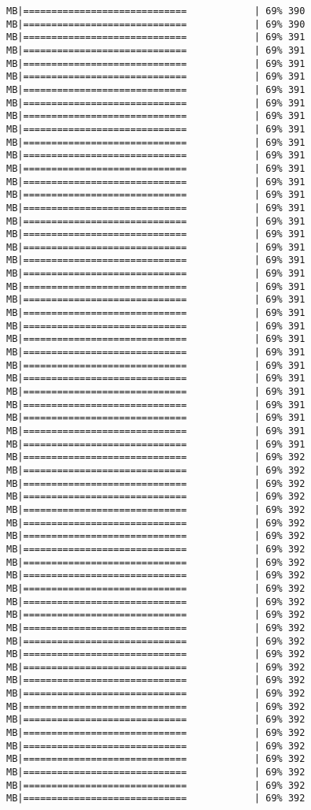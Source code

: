 \documentclass[
]{article}
\begin{document}
\begin{verbatim}
MB|=============================            | 69% 390 MB|=============================            | 69% 390 MB|=============================            | 69% 391 MB|=============================            | 69% 391 MB|=============================            | 69% 391 MB|=============================            | 69% 391 MB|=============================            | 69% 391 MB|=============================            | 69% 391 MB|=============================            | 69% 391 MB|=============================            | 69% 391 MB|=============================            | 69% 391 MB|=============================            | 69% 391 MB|=============================            | 69% 391 MB|=============================            | 69% 391 MB|=============================            | 69% 391 MB|=============================            | 69% 391 MB|=============================            | 69% 391 MB|=============================            | 69% 391 MB|=============================            | 69% 391 MB|=============================            | 69% 391 MB|=============================            | 69% 391 MB|=============================            | 69% 391 MB|=============================            | 69% 391 MB|=============================            | 69% 391 MB|=============================            | 69% 391 MB|=============================            | 69% 391 MB|=============================            | 69% 391 MB|=============================            | 69% 391 MB|=============================            | 69% 391 MB|=============================            | 69% 391 MB|=============================            | 69% 391 MB|=============================            | 69% 391 MB|=============================            | 69% 391 MB|=============================            | 69% 391 MB|=============================            | 69% 392 MB|=============================            | 69% 392 MB|=============================            | 69% 392 MB|=============================            | 69% 392 MB|=============================            | 69% 392 MB|=============================            | 69% 392 MB|=============================            | 69% 392 MB|=============================            | 69% 392 MB|=============================            | 69% 392 MB|=============================            | 69% 392 MB|=============================            | 69% 392 MB|=============================            | 69% 392 MB|=============================            | 69% 392 MB|=============================            | 69% 392 MB|=============================            | 69% 392 MB|=============================            | 69% 392 MB|=============================            | 69% 392 MB|=============================            | 69% 392 MB|=============================            | 69% 392 MB|=============================            | 69% 392 MB|=============================            | 69% 392 MB|=============================            | 69% 392 MB|=============================            | 69% 392 MB|=============================            | 69% 392 MB|=============================            | 69% 392 MB|=============================            | 69% 392 MB|=============================            | 69% 392 
\end{verbatim}
\end{document}
